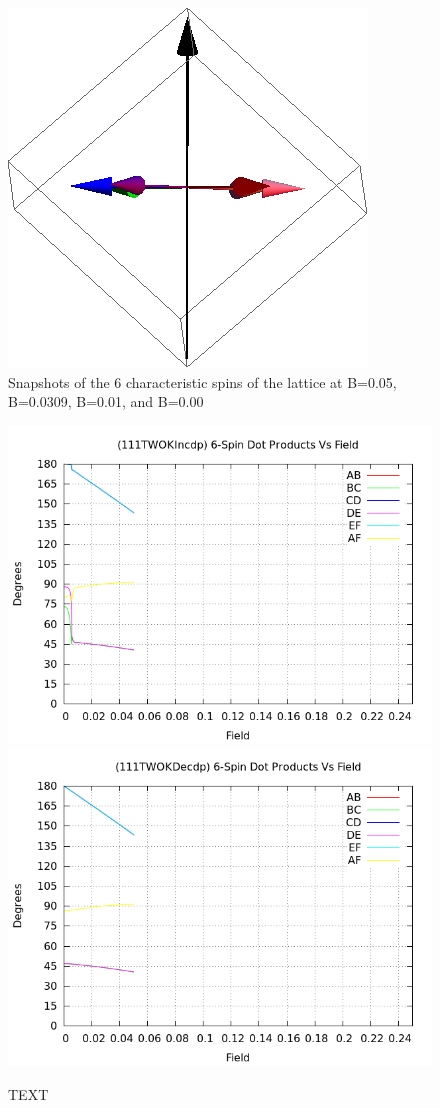 \documentclass{article}
\begin{document}
\begin{figure}[ht]
\includegraphics[scale=0.28]{111_2000/4S005to000G.png}
\caption{Snapshots of the 6 characteristic spins of the lattice at B=0.05, B=0.0309, B=0.01, and B=0.00}
\end{figure}

\begin{figure}
\centering
\includegraphics[scale=0.5]{HVariedData/Pictures/111TWOKIncdp.png}
\includegraphics[scale=0.5]{HVariedData/Pictures/111TWOKDecdp.png}
\caption{TEXT}
\end{figure}
\end{document}
